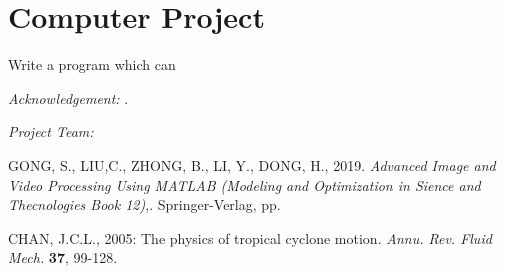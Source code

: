 \documentclass{SBCbookchapter}
\begin{document}
\section{Computer Project}
Write a program which can





\vspace{1in}

\emph{Acknowledgement:}
.
\vspace{.25in}

\emph{Project Team:}

\newpage
 \begin{thebibliography}{9}

   {\sc  GONG, S., LIU,C., ZHONG, B., LI, Y., DONG, H.}, 2019. {\em Advanced Image and Video Processing Using MATLAB (Modeling and Optimization in Sience and Thecnologies Book 12)},. Springer-Verlag,  pp.

 {\sc CHAN, J.C.L.}, 2005: The physics of tropical cyclone motion. \emph{Annu. Rev. Fluid Mech.} {\bf 37}, 99-128.

\end{thebibliography}
\end{document}
